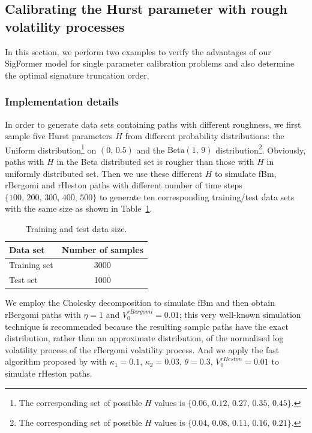 \documentclass[]{article}
\renewcommand{\(}{\left(}
\renewcommand{\)}{\right)}
\begin{document}
	\subsection{Calibrating the Hurst parameter with rough volatility processes}
	\label{subsec-single-calibration}
	In this section, we perform two examples to verify the advantages of our SigFormer model for single parameter calibration problems and also determine the optimal signature truncation order.
	
	\subsubsection{Implementation details}
	\label{subsubsec-single-implementation}
	In order to generate data sets containing paths with different roughness, we first sample five Hurst parameters $H$ from different probability distributions: the Uniform distribution\footnote{The corresponding set of possible $H$ values is $\{0.06,\,0.12,\,0.27,\,0.35,\,0.45\}$.} on $(0,\,0.5)$ and the $\text{Beta}(1,\,9)$ distribution\footnote{The corresponding set of possible $H$ values is $\{0.04,\,0.08,\,0.11,\,0.16,\,0.21\}$.}. Obviously, paths with $H$ in the Beta distributed set is rougher than those with $H$ in uniformly distributed set. Then we use these different $H$ to simulate fBm, rBergomi and rHeston paths with different number of time steps $\{100,\,200,\,300,\,400,\,500\}$ to generate ten corresponding training/test data sets with the same size as shown in Table~\ref{tab-data-size}.
	\begin{table}[H]
		\caption{Training and test data size.}
		\label{tab-data-size}
		\smallskip
		\centering
		\renewcommand\arraystretch{1.5}
		\begin{tabular}{l c}
			\toprule
			Data set&Number of samples\\
			\hline
			Training set&3000\\
			Test set&1000\\	
			\bottomrule
		\end{tabular}
	\end{table}
	We employ the Cholesky decomposition to simulate fBm and then obtain rBergomi paths with $\eta=1$ and $V_0^{rBergomi}=0.01$; this very well-known simulation technique is recommended because the resulting sample paths have the exact distribution, rather than an approximate distribution, of the normalised log volatility process of the rBergomi volatility process. And we apply the fast algorithm proposed by \cite{ma_2022_fast} with $\kappa_1=0.1,\,\kappa_2=0.03,\,\theta=0.3,\,V_0^{rHeston}=0.01$ to simulate rHeston paths. 
	
\end{document}
